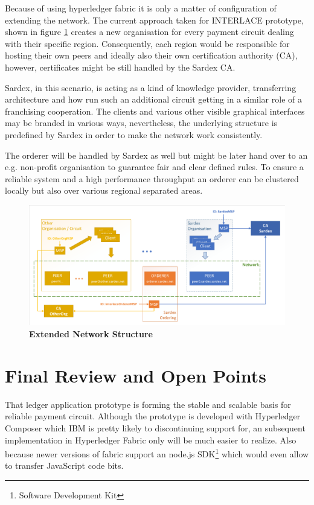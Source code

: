 Because of using hyperledger fabric it is only a matter of configuration of extending the network. The current approach taken for INTERLACE prototype, shown in figure \ref{fig:prototype-net-ext} creates a new organisation for every payment circuit dealing with their specific region. Consequently, each region would be responsible for hosting their own peers and ideally also their own certification authority (CA), however, certificates might be still handled by the Sardex CA. 

Sardex, in this scenario, is acting as a kind of knowledge provider, transferring architecture and how run such an additional circuit getting in a similar role of a franchising cooperation. The clients and various other visible graphical interfaces may be branded in various ways, nevertheless, the underlying structure is predefined by Sardex in order to make the network work consistently.

The orderer will be handled by Sardex as well but might be later hand over to an e.g. non-profit organisation to guarantee fair and clear defined rules. To ensure a reliable system and a high performance throughput an orderer can be clustered locally but also over various regional separated areas.

\begin{figure}[htbp]
  \centering
  \includegraphics[width=1.0\textwidth, clip, trim=1mm 1mm 1mm 1mm]{Figures/extended-network}
  \caption{\bf\small Extended Network Structure}
  \label{fig:prototype-net-ext}
\end{figure}

\section{Final Review and Open Points}

That ledger application prototype is forming the stable and scalable basis for reliable payment circuit. Although the prototype is developed with Hyperledger Composer which IBM is pretty likely to discontinuing support for, an subsequent implementation in Hyperledger Fabric only will be much easier to realize. Also because newer versions of fabric support an node.js SDK\footnote{Software Development Kit} which would even allow to transfer JavaScript code bits.

